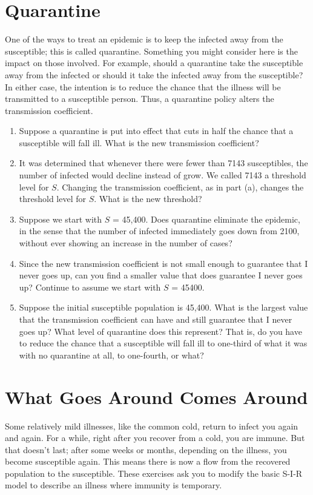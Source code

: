 \documentclass
[justified,nohyper]
{tufte-handout}
\begin{document}
\section{Quarantine}
One of the ways to treat an epidemic is to keep the infected away from the susceptible; this is called quarantine. Something you might consider here is the impact on those involved. For example, should a quarantine take the susceptible away from the infected or should it take the infected away from the susceptible? In either case, the intention is to reduce the chance that the illness will be transmitted to a susceptible person. Thus, a quarantine policy alters the transmission coefficient.
\begin{enumerate}
	\item Suppose a quarantine is put into effect that cuts in half the chance that a susceptible will fall ill. What is the new transmission coefficient?
	\item It was determined that whenever there were fewer than 7143 susceptibles, the number of infected would decline instead of grow. We called 7143 a threshold level for $S$. Changing the transmission coefficient, as in part (a), changes the threshold level for $S$. What is the new threshold?
	\item Suppose we start with $S$ = 45,400. Does quarantine eliminate the epidemic, in the sense that the number of infected immediately goes down from 2100, without ever showing an increase in the number of cases?
	\item Since the new transmission coefficient is not small enough to guarantee that I never goes up, can you find a smaller value that does guarantee I never goes up? Continue to assume we start with $S$ = 45400.
	\item Suppose the initial susceptible population is 45,400. What is the largest value that the transmission coefficient can have and still guarantee that I never goes up? What level of quarantine does this represent? That is, do you have to reduce the chance that a susceptible will fall ill to one-third of what it was with no quarantine at all, to one-fourth, or what?
\end{enumerate}

\section{What Goes Around Comes Around}
Some relatively mild illnesses, like the common cold, return to infect you again and again. For a while, right after you recover from a cold, you are immune. But that doesn't last; after some weeks or months, depending on the illness, you become susceptible again. This means there is now a flow from the recovered population to the susceptible. These exercises ask you to modify the basic S-I-R model to describe an illness where immunity is temporary.
\end{document}
